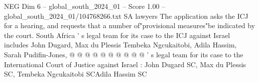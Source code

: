 \begin{textsample}{NEG Dim 6 – global\_south\_2024\_01 – Score 1.00 – global\_south\_2024\_01/104768266.txt}
SA lawyers The application asks the ICJ for a hearing, and requests that a number of"provisional measures"be indicated by the court.
South Africa ' s legal team for its case to the ICJ against Israel includes John Dugard, Max du Plessis Tembeka Ngcukaitobi, Adila Hassim, Sarah Pudifin-Jones, @ @ @ @ @ @ @ @ @ @ ' s legal team for its case to the International Court of Justice against Israel : John Dugard SC, Max du Plessis SC, Tembeka Ngcukaitobi SCAdila Hassim SC

\end{textsample}
